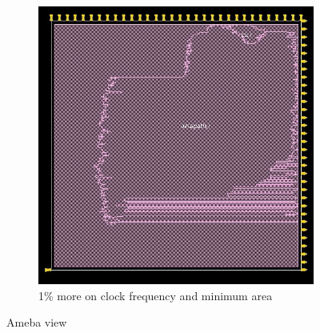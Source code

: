 \begin{figure}[!htbp]
    \begin{subfigure}[b]{0.4\linewidth}
\includegraphics[width=1\linewidth,scale=0.6,angle=0]{../project/physical_design/images_1_minarea/DLX_IR_SIZE32_PC_SIZE32_1_minarea_ameba_prerouting.jpg}
\caption{1\% more on clock frequency and minimum area}
\label{fig:ameba1minarea}
  \end{subfigure}
\caption{Ameba view}
  \label{fig:ameba}
\end{figure}


